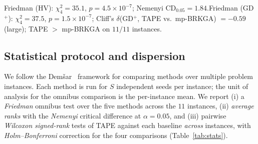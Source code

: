 \documentclass[11pt]{article}
\begin{document}
\begin{table}[t]
\centering
\caption{Statistical analysis over all $11$ instances at $20$ seeds (Friedman + average ranks;
lower rank = better). Holm-adjusted pairwise $p$-values are TAPE vs.\ each method on
$\mathrm{HV}/\mathrm{HV}^\star$. ${}^\star$ denotes $p_{\text{Holm}}<0.05$. TAPE vs.\ attention
is not significant ($p=0.83$)---they are statistically tied, as Section~\ref{sec:ladder}
explains, with TAPE marginally ahead on average rank.}
\label{tab:stats}
\small
\setlength{\tabcolsep}{6pt}

\vspace{3pt}
{\footnotesize Friedman (HV): $\chi^2_4 = 35.1$, $p = 4.5\times10^{-7}$; Nemenyi
$\mathrm{CD}_{0.05} = 1.84$.\quad Friedman (GD$^+$): $\chi^2_4 = 37.5$,
$p = 1.5\times10^{-7}$; Cliff's $\delta$(GD$^+$, TAPE vs.\ mp-BRKGA) $= -0.59$ (large);
TAPE $>$ mp-BRKGA on $11/11$ instances.}
\end{table}

\subsection{Statistical protocol and dispersion}
\label{sec:stats}
We follow the Dem\v{s}ar~\cite{demsar2006} framework for comparing methods over multiple
problem instances. Each method is run for $S$ independent seeds per instance; the unit of
analysis for the omnibus comparison is the per-instance mean. We report (i) a
\emph{Friedman} omnibus test over the five methods across the $11$ instances, (ii)
\emph{average ranks} with the \emph{Nemenyi} critical difference at $\alpha=0.05$, and (iii)
pairwise \emph{Wilcoxon signed-rank} tests of TAPE against each baseline \emph{across}
instances, with \emph{Holm--Bonferroni} correction for the four comparisons
(Table~\ref{tab:stats}).
\end{document}
